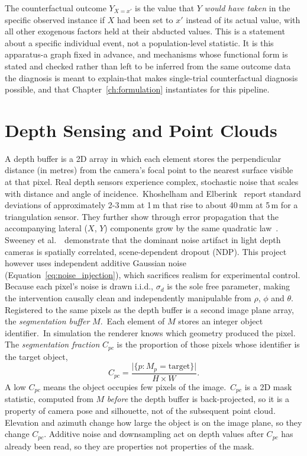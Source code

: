 \documentclass[11pt,a4paper]{report}
\begin{document}
The counterfactual outcome $Y_{X=x'}$ is the value that $Y$ \emph{would have taken} in the specific observed instance if $X$ had been set to $x'$ instead of its actual value, with all other exogenous factors held at their abducted values. This is a statement about a specific individual event, not a population-level statistic. It is this apparatus-a graph fixed in advance, and mechanisms whose functional form is stated and checked rather than left to be inferred from the same outcome data the diagnosis is meant to explain-that makes single-trial counterfactual diagnosis possible, and that Chapter~\ref{ch:formulation} instantiates for this pipeline.

\section{Depth Sensing and Point Clouds}
\label{sec:bg_depth}

\noindent A depth buffer is a 2D array in which each element stores the perpendicular distance (in metres) from the camera's focal point to the nearest surface visible at that pixel. Real depth sensors experience complex, stochastic noise that scales with distance and angle of incidence.~Khoshelham and Elberink~\cite{khoshelham2011accuracy} report standard deviations of approximately 2-3\,mm at 1\,m that rise to about 40\,mm at 5\,m for a triangulation sensor. They further show through error propagation that the accompanying lateral ($X$, $Y$) components grow by the same quadratic law~\cite{khoshelham2011accuracy}. Sweeney et al.~\cite{sweeney2019supervised}~demonstrate that the dominant noise artifact in light depth cameras is spatially correlated, scene-dependent dropout (NDP). This project however uses independent additive Gaussian noise (Equation~\ref{eq:noise_injection}), which sacrifices realism for experimental control. Because each pixel's noise is drawn i.i.d., $\sigma_d$ is the sole free parameter, making the intervention causally clean and independently manipulable from $\rho$, $\phi$ and $\theta$. \\

\noindent Registered to the same pixels as the depth buffer is a second image plane array, the \emph{segmentation buffer} $M$.~Each element of $M$ stores an integer object identifier.~In simulation the renderer knows which geometry produced the pixel. The \emph{segmentation fraction} $C_{pc}$ is the proportion of those pixels whose identifier is the target object,
\begin{equation}
  C_{pc} = \frac{\lvert\{p : M_p = \mathrm{target}\}\rvert}{H \times W}.
  \label{eq:cpc_def}
\end{equation}
A low $C_{pc}$ means the object occupies few pixels of the image.~$C_{pc}$ is a 2D mask statistic, computed from $M$ \emph{before} the depth buffer is back-projected, so it is a property of camera pose and silhouette, not of the subsequent point cloud. Elevation and azimuth change how large the object is on the image plane, so they change $C_{pc}$. Additive noise and downsampling act on depth values after $C_{pc}$ has already been read, so they are properties not properties of the mask.\\
\end{document}
